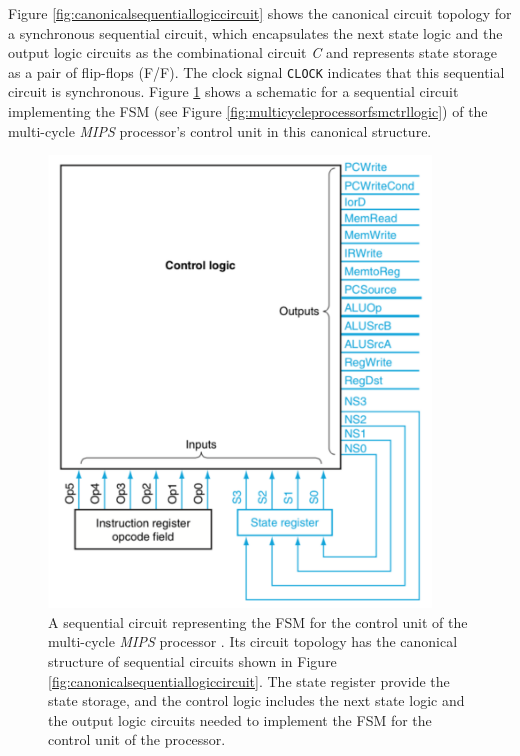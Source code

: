 Figure \ref{fig:canonicalsequentiallogiccircuit} shows the canonical circuit topology for a synchronous sequential circuit, which encapsulates the next state logic and the output logic circuits as the combinational circuit {\it C} and represents state storage as a pair of flip-flops (F/F). The clock signal {\tt CLOCK} indicates that this sequential circuit is synchronous. Figure \ref{fig:controllogicmulticycleprocessor} shows a schematic for a sequential circuit implementing the FSM (see Figure \ref{fig:multicycleprocessorfsmctrllogic}) of the multi-cycle {\it MIPS} processor's control unit in this canonical structure. \\

\begin{figure}[h]
\centering 
\includegraphics[width=4in]{./pics/control-logic-multi-cycle-processor}
\caption{A sequential circuit representing the FSM for the control unit of the multi-cycle {\it MIPS} processor \cite{Patterson2005a}. Its circuit topology has the canonical structure of sequential circuits shown in Figure \ref{fig:canonicalsequentiallogiccircuit}. The state register provide the state storage, and the control logic includes the next state logic and the output logic circuits needed to implement the FSM for the control unit of the processor.}
\label{fig:controllogicmulticycleprocessor}
\end{figure}

